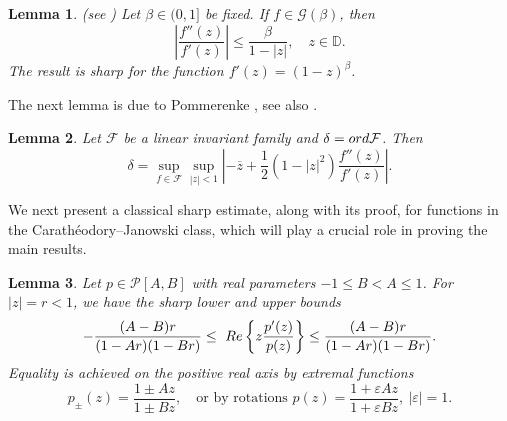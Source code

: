 \documentclass[12pt,a4paper]{amsart}
\numberwithin{equation}{section}
\newtheorem{lemma}{Lemma}[section]
\theoremstyle{remark}
\begin{document}
\begin{lemma}\label{lem Obradovic2013}{\rm(}see \cite{OPW}{\rm)}
Let $\beta\in(0,1]$ be fixed. If $f\in \mathcal{G}(\beta)$, then
\begin{equation*}
  \left|\frac{f''(z)}{f'(z)}\right|\leq \frac{\beta}{1-|z|},\quad z\in\mathbb{D}.
\end{equation*}
The result is sharp for the function $f'(z)=(1-z)^\beta$.
\end{lemma}
The next lemma is due to Pommerenke \cite{Pom}, see also \cite[Lemma 5.1.3]{Graham}.
\begin{lemma}\label{lem linear invariant}
  Let $\mathcal{F}$ be a linear invariant family and $\delta={\rm ord}\mathcal{F}$. Then
\begin{equation*}\label{delta= sup sup}\delta=\sup_{f\in\mathcal{F}}\sup_{|z|<1}\left|-\overline{z}
    +\frac{1}{2}(1-|z|^2)\frac{f''(z)}{f'(z)}\right|.
  \end{equation*}
\end{lemma}

We next present a classical sharp estimate, along with its proof, for functions in the Carath\'eodory--Janowski class, which will play a crucial role in proving the main results.

\begin{lemma}\label{lem:est-Cara-Janowski-sharp}
Let $p\in \mathcal{P}[A,B]$ with real parameters $-1\le B<A\le 1$. For $|z|=r<1$, we have the sharp lower and upper bounds
\begin{equation}\label{eq:PAB-bound-sharp}
-\frac{(A-B)r}{(1-A r)(1-B r)}
\le\ {\rm Re}\left\{ z\frac{p'(z)}{p(z)} \right\} \le\frac{(A-B)r}{(1-A r)(1-B r)}.
\end{equation}
Equality is achieved on the positive real axis by extremal functions
\[
p_\pm(z)=\frac{1 \pm A z}{1 \pm B z}, \quad \text{or by rotations } p(z)=\frac{1+\varepsilon A z}{1+\varepsilon B z},\ |\varepsilon|=1.
\]
\end{lemma}
\end{document}
